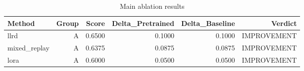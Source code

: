 \begin{table}[htbp]
\centering
\caption{Main ablation results}
\label{tab:main-results}
\begin{tabular}{lrrrrr}
\toprule
\textbf{Method} & \textbf{Group} & \textbf{Score} & \textbf{Delta\_Pretrained} & \textbf{Delta\_Baseline} & \textbf{Verdict} \\
\midrule
llrd & A & 0.6500 & 0.1000 & 0.1000 & IMPROVEMENT \\
mixed\_replay & A & 0.6375 & 0.0875 & 0.0875 & IMPROVEMENT \\
lora & A & 0.6000 & 0.0500 & 0.0500 & IMPROVEMENT \\
\bottomrule
\end{tabular}
\end{table}
